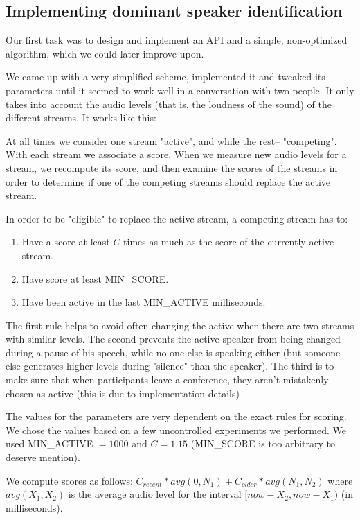 \documentclass[twoside,openright,a4paper,12pt,english]{article}
\begin{document}
\subsection{Implementing dominant speaker identification}
Our first task was to design and implement an API and a simple, non-optimized
algorithm, which we could later improve upon. 

We came up with a very simplified scheme, implemented it and tweaked its parameters until it seemed to
work well in a conversation with two people. It only takes into account the
audio levels (that is, the loudness of the sound) of the different streams. It
works like this:

At all times we consider one stream "active", and while the rest--
"competing". With each stream we associate a score. When we measure new audio levels for a stream,
we recompute its score, and then examine the scores of the streams in order to determine if one of the
competing streams should replace the active stream.

In order to be "eligible" to replace the active stream, a competing stream has to:
\begin{enumerate}
    \item Have a score at least $C$ times as much as the score of the currently active stream.
    \item Have score at least MIN\_SCORE.
    \item Have been active in the last MIN\_ACTIVE milliseconds.
\end{enumerate}

The first rule helps to avoid often changing the active when there are two
streams with similar levels. The second prevents the active speaker from being
changed during a pause of his speech, while no one else is speaking either (but
someone else generates higher levels during "silence" than the speaker). The
third is to make sure that when participants leave a conference, they aren't
mistakenly chosen as active (this is due to implementation details)

The values for the parameters are very dependent on the exact rules for scoring.
We chose the values based on a few uncontrolled experiments we performed. We used
MIN\_ACTIVE $= 1000$ and $C = 1.15$ (MIN\_SCORE is too arbitrary to deserve mention).

We compute scores as follows: $C_{recent} * avg(0, N_1) + C_{older} * avg(N_1, N_2)$
where $avg(X_1, X_2)$ is the average audio level for the interval $[now-X_2,
now-X_1)$ (in milliseconds). 
\end{document}
